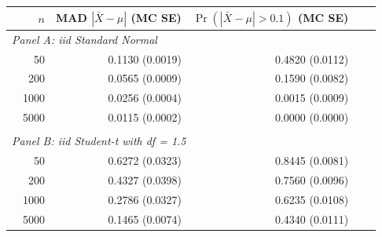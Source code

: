 \begin{tabular}{lrrrrr}
\toprule
 & $n$ & MAD $|\bar X - \mu|$ (MC SE) & $\Pr(|\bar X - \mu| > 0.1)$ (MC SE) & \\
\midrule
\multicolumn{5}{l}{\textit{Panel A: iid Standard Normal}} \\
\midrule
 & 50 & 0.1130 (0.0019) & 0.4820 (0.0112) & \\
 & 200 & 0.0565 (0.0009) & 0.1590 (0.0082) & \\
 & 1000 & 0.0256 (0.0004) & 0.0015 (0.0009) & \\
 & 5000 & 0.0115 (0.0002) & 0.0000 (0.0000) & \\
\\[0.5em]
\multicolumn{5}{l}{\textit{Panel B: iid Student-t with df = 1.5}} \\
\midrule
 & 50 & 0.6272 (0.0323) & 0.8445 (0.0081) & \\
 & 200 & 0.4327 (0.0398) & 0.7560 (0.0096) & \\
 & 1000 & 0.2786 (0.0327) & 0.6235 (0.0108) & \\
 & 5000 & 0.1465 (0.0074) & 0.4340 (0.0111) & \\
\bottomrule
\end{tabular}
